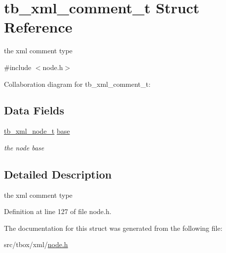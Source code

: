 \hypertarget{structtb__xml__comment__t}{\section{tb\-\_\-xml\-\_\-comment\-\_\-t Struct Reference}
\label{structtb__xml__comment__t}
}


the xml comment type  




{\ttfamily \#include $<$node.\-h$>$}



Collaboration diagram for tb\-\_\-xml\-\_\-comment\-\_\-t\-:
\subsection*{Data Fields}
\begin{DoxyCompactItemize}
\item 
\hypertarget{structtb__xml__comment__t_aac900c7fde87096b663ffa96970210fc}{\hyperlink{structtb__xml__node__t}{tb\-\_\-xml\-\_\-node\-\_\-t} \hyperlink{structtb__xml__comment__t_aac900c7fde87096b663ffa96970210fc}{base}}\label{structtb__xml__comment__t_aac900c7fde87096b663ffa96970210fc}

\begin{DoxyCompactList}\small\item\em the node base \end{DoxyCompactList}\end{DoxyCompactItemize}


\subsection{Detailed Description}
the xml comment type 

Definition at line 127 of file node.\-h.



The documentation for this struct was generated from the following file\-:\begin{DoxyCompactItemize}
\item 
src/tbox/xml/\hyperlink{node_8h}{node.\-h}\end{DoxyCompactItemize}

